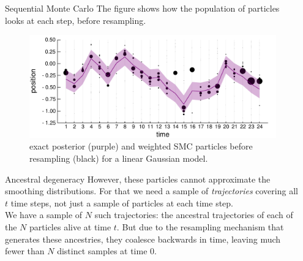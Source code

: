 \documentclass[final, 12pt]{beamer}
\newlength{\colwidth}
\begin{document}
\begin{frame}
\begin{columns}
\begin{column}{\colwidth}
\begin{block}{Sequential Monte Carlo}
The figure shows how the population of particles looks at each step, before resampling.
\begin{figure}
\includegraphics[width=\colwidth]{smc_kalman.pdf}
\caption{exact posterior (purple) and weighted SMC particles before resampling (black) for a linear Gaussian model.}
\end{figure}
\end{block}

\begin{block}{Ancestral degeneracy}
However, these particles cannot approximate the smoothing distributions. For that we need a sample of \emph{trajectories} covering all $t$ time steps, not just a sample of particles at each time step.\\[10pt]

We have a sample of $N$ such trajectories: the ancestral trajectories of each of the $N$ particles alive at time $t$.
But due to the resampling mechanism that generates these ancestries, they coalesce backwards in time, leaving much fewer than $N$ distinct samples at time 0.


\end{block}
\end{column}

\begin{column}{\colwidth}
\begin{block}

\end{block}
\end{column}
\end{columns}

\end{frame}
\end{document}
